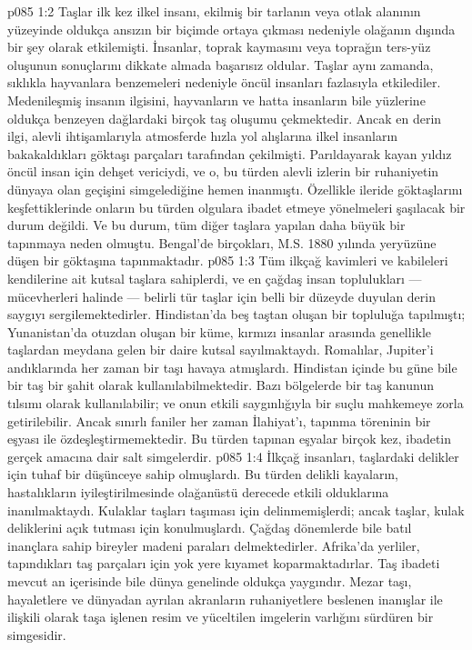 \vs p085 1:2 Taşlar ilk kez ilkel insanı, ekilmiş bir tarlanın veya otlak alanının yüzeyinde oldukça ansızın bir biçimde ortaya çıkması nedeniyle olağanın dışında bir şey olarak etkilemişti. İnsanlar, toprak kaymasını veya toprağın ters\hyp{}yüz oluşunun sonuçlarını dikkate almada başarısız oldular. Taşlar aynı zamanda, sıklıkla hayvanlara benzemeleri nedeniyle öncül insanları fazlasıyla etkilediler. Medenileşmiş insanın ilgisini, hayvanların ve hatta insanların bile yüzlerine oldukça benzeyen dağlardaki birçok taş oluşumu çekmektedir. Ancak en derin ilgi, alevli ihtişamlarıyla atmosferde hızla yol alışlarına ilkel insanların bakakaldıkları göktaşı parçaları tarafından çekilmişti. Parıldayarak kayan yıldız öncül insan için dehşet vericiydi, ve o, bu türden alevli izlerin bir ruhaniyetin dünyaya olan geçişini simgelediğine hemen inanmıştı. Özellikle ileride göktaşlarını keşfettiklerinde onların bu türden olgulara ibadet etmeye yönelmeleri şaşılacak bir durum değildi. Ve bu durum, tüm diğer taşlara yapılan daha büyük bir tapınmaya neden olmuştu. Bengal’de birçokları, M.S. 1880 yılında yeryüzüne düşen bir göktaşına tapınmaktadır.
\vs p085 1:3 Tüm ilkçağ kavimleri ve kabileleri kendilerine ait kutsal taşlara sahiplerdi, ve en çağdaş insan toplulukları --- mücevherleri halinde --- belirli tür taşlar için belli bir düzeyde duyulan derin saygıyı sergilemektedirler. Hindistan’da beş taştan oluşan bir topluluğa tapılmıştı; Yunanistan’da otuzdan oluşan bir küme, kırmızı insanlar arasında genellikle taşlardan meydana gelen bir daire kutsal sayılmaktaydı. Romalılar, Jupiter’i andıklarında her zaman bir taşı havaya atmışlardı. Hindistan içinde bu güne bile bir taş bir şahit olarak kullanılabilmektedir. Bazı bölgelerde bir taş kanunun tılsımı olarak kullanılabilir; ve onun etkili saygınlığıyla bir suçlu mahkemeye zorla getirilebilir. Ancak sınırlı faniler her zaman İlahiyat’ı, tapınma töreninin bir eşyası ile özdeşleştirmemektedir. Bu türden tapınan eşyalar birçok kez, ibadetin gerçek amacına dair salt simgelerdir.
\vs p085 1:4 İlkçağ insanları, taşlardaki delikler için tuhaf bir düşünceye sahip olmuşlardı. Bu türden delikli kayaların, hastalıkların iyileştirilmesinde olağanüstü derecede etkili olduklarına inanılmaktaydı. Kulaklar taşları taşıması için delinmemişlerdi; ancak taşlar, kulak deliklerini açık tutması için konulmuşlardı. Çağdaş dönemlerde bile batıl inançlara sahip bireyler madeni paraları delmektedirler. Afrika’da yerliler, tapındıkları taş parçaları için yok yere kıyamet koparmaktadırlar. Taş ibadeti mevcut an içerisinde bile dünya genelinde oldukça yaygındır. Mezar taşı, hayaletlere ve dünyadan ayrılan akranların ruhaniyetlere beslenen inanışlar ile ilişkili olarak taşa işlenen resim ve yüceltilen imgelerin varlığını sürdüren bir simgesidir.
